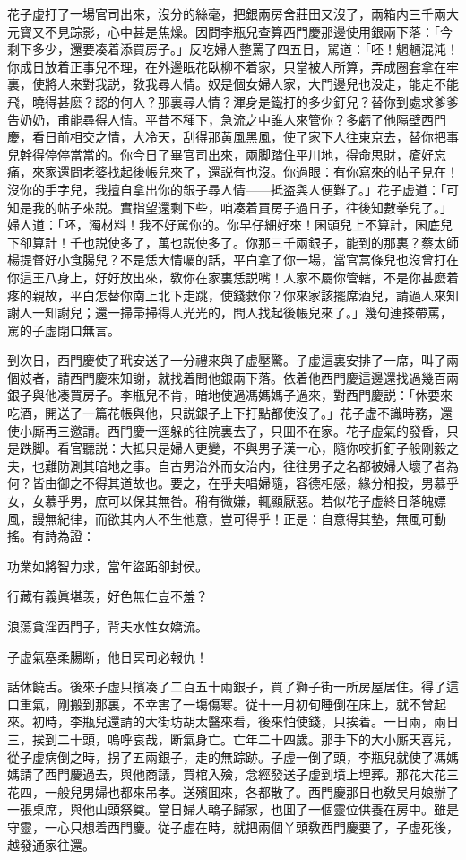 花子虚打了一場官司出來，沒分的絲毫，把銀兩房舍莊田又沒了，兩箱内三千兩大元寳又不見踪影，心中甚是焦燥。因問李瓶兒查算西門慶那邊使用銀兩下落：「今剩下多少，還要凑着添買房子。」反吃婦人整罵了四五日，駡道：「呸！魍魎混沌！你成日放着正事兒不理，在外邊眠花臥柳不着家，只當被人所算，弄成圈套拿在牢裏，使將人來對我説，敎我尋人情。奴是個女婦人家，大門邊兒也没走，能走不能飛，曉得甚麽？認的何人？那裏尋人情？渾身是鐵打的多少釘兒？替你到處求爹爹告奶奶，甫能尋得人情。平昔不種下，急流之中誰人來管你？多虧了他隔壁西門慶，看日前相交之情，大冷天，刮得那黄風黑風，使了家下人往東京去，替你把事兒幹得停停當當的。你今日了畢官司出來，兩脚踏住平川地，得命思財，瘡好忘痛，來家還問老婆找起後帳兒來了，還説有也沒。你過眼：有你寫來的帖子見在！沒你的手字兒，我擅自拿出你的銀子尋人情——抵盗與人便難了。」花子虚道：「可知是我的帖子來説。實指望還剩下些，咱凑着買房子過日子，往後知數拳兒了。」婦人道：「呸，濁材料！我不好駡你的。你早仔細好來！囷頭兒上不算計，囷底兒下卻算計！千也説使多了，萬也説使多了。你那三千兩銀子，能到的那裏？蔡太師楊提督好小食腸兒？不是恁大情囑的話，平白拿了你一場，當官蒿條兒也沒曾打在你這王八身上，好好放出來，敎你在家裏恁説嘴！人家不屬你管轄，不是你甚麽着疼的親故，平白怎替你南上北下走跳，使錢救你？你來家該擺席酒兒，請過人來知謝人一知謝兒；還一掃帚掃得人光光的，問人找起後帳兒來了。」幾句連搽帶罵，駡的子虚閉口無言。

到次日，西門慶使了玳安送了一分禮來與子虚壓驚。子虚這裏安排了一席，叫了兩個妓者，請西門慶來知謝，就找着問他銀兩下落。依着他西門慶這邊還找過幾百兩銀子與他凑買房子。李瓶兒不肯，暗地使過馮媽媽子過來，對西門慶説：「休要來吃酒，開送了一篇花帳與他，只説銀子上下打點都使沒了。」花子虚不識時務，還使小廝再三邀請。西門慶一逕躲的往院裏去了，只囬不在家。花子虚氣的發昏，只是跌脚。看官聽説：大抵只是婦人更變，不與男子漢一心，隨你咬折釘子般剛毅之夫，也難防測其暗地之事。自古男治外而女治内，往往男子之名都被婦人壞了者為何？皆由御之不得其道故也。要之，在乎夫唱婦隨，容德相感，緣分相投，男慕乎女，女慕乎男，庶可以保其無咎。稍有微嫌，輒顯厭惡。若似花子虚終日落魄嫖風，謾無紀律，而欲其内人不生他意，豈可得乎！正是：自意得其墊，無風可動搖。有詩為證：

\begin{myquote}
功業如將智力求，當年盜跖卻封侯。

行藏有義眞堪羡，好色無仁豈不羞？

浪蕩貪淫西門子，背夫水性女嬌流。

子虚氣塞柔腸断，他日冥司必報仇！
\end{myquote}

話休饒舌。後來子虚只擯凑了二百五十兩銀子，買了獅子街一所房屋居住。得了這口重氣，剛搬到那裏，不幸害了一塲傷寒。従十一月初旬睡倒在床上，就不曾起來。初時，李瓶兒還請的大街坊胡太醫來看，後來怕使錢，只挨着。一日兩，兩日三，挨到二十頭，嗚呼哀哉，断氣身亡。亡年二十四歲。那手下的大小廝天喜兒，從子虚病倒之時，拐了五兩銀子，走的無踪跡。子虚一倒了頭，李瓶兒就使了馮媽媽請了西門慶過去，與他商議，買棺入殮，念經發送子虚到墳上埋葬。那花大花三花四，一般兒男婦也都來吊孝。送殯囬來，各都散了。西門慶那日也敎吴月娘辦了一張桌席，與他山頭祭奠。當日婦人轎子歸家，也囬了一個靈位供養在房中。雖是守靈，一心只想着西門慶。従子虚在時，就把兩個丫頭敎西門慶要了，子虚死後，越發通家往還。

